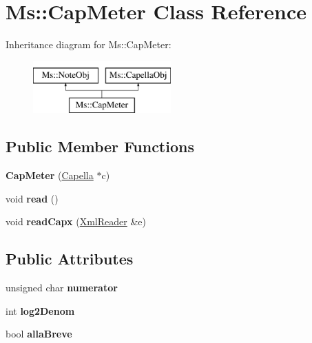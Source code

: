 \hypertarget{class_ms_1_1_cap_meter}{}\section{Ms\+:\+:Cap\+Meter Class Reference}
\label{class_ms_1_1_cap_meter}
Inheritance diagram for Ms\+:\+:Cap\+Meter\+:\begin{figure}[H]
\begin{center}
\leavevmode
\includegraphics[height=2.000000cm]{class_ms_1_1_cap_meter}
\end{center}
\end{figure}
\subsection*{Public Member Functions}
\begin{DoxyCompactItemize}
\item 
\mbox{\label{class_ms_1_1_cap_meter_aca20846120387c427553d2a502a590c6}} 
{\bfseries Cap\+Meter} (\hyperlink{class_ms_1_1_capella}{Capella} $\ast$c)
\item 
\mbox{\label{class_ms_1_1_cap_meter_a1e623251a13707b6226ae44915f229fa}} 
void {\bfseries read} ()
\item 
\mbox{\label{class_ms_1_1_cap_meter_ae5ebdf049762c247fd3199fd7ea7dd06}} 
void {\bfseries read\+Capx} (\hyperlink{class_ms_1_1_xml_reader}{Xml\+Reader} \&e)
\end{DoxyCompactItemize}
\subsection*{Public Attributes}
\begin{DoxyCompactItemize}
\item 
\mbox{\label{class_ms_1_1_cap_meter_a8308030dddc8abf14736c474a1f27d4d}} 
unsigned char {\bfseries numerator}
\item 
\mbox{\label{class_ms_1_1_cap_meter_a671abc95fb0436b4a269d6626a832e4b}} 
int {\bfseries log2\+Denom}
\item 
\mbox{\label{class_ms_1_1_cap_meter_a8d6f15629e6822fab4f664964c672e9b}} 
bool {\bfseries alla\+Breve}
\end{DoxyCompactItemize}
